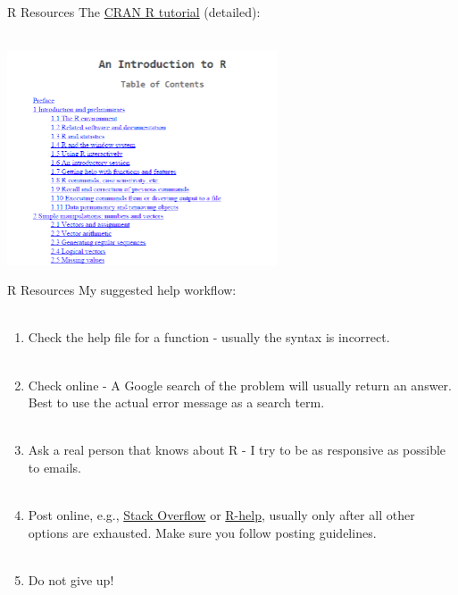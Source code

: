 \documentclass[xcolor=svgnames]{beamer}\usepackage[]{graphicx}\usepackage[]{color}
\begin{document}
\begin{frame}[t]{R Resources}
The \href{http://cran.r-project.org/doc/manuals/R-intro.html}{CRAN R tutorial} (detailed):\\~\\
\vfill
\centerline{\includegraphics[width = 0.6\textwidth]{cran_intro.png}}
\vfill
\end{frame}

\begin{frame}[t]{R Resources}
My suggested help workflow: \\~\\
\begin{enumerate}
\item Check the help file for a function - usually the syntax is incorrect. \\~\\
\item Check online - A Google search of the problem will usually return an answer.  Best to use the actual error message as a search term. \\~\\
\item Ask a real person that knows about R - I try to be as responsive as possible to emails. \\~\\
\item Post online, e.g., \href{http://stackoverflow.com/}{Stack Overflow} or \href{https://stat.ethz.ch/mailman/listinfo/r-help}{R-help}, usually only after all other options are exhausted.  Make sure you follow posting guidelines.\\~\\
\item Do not give up!
\end{enumerate}
\end{frame}
\end{document}
